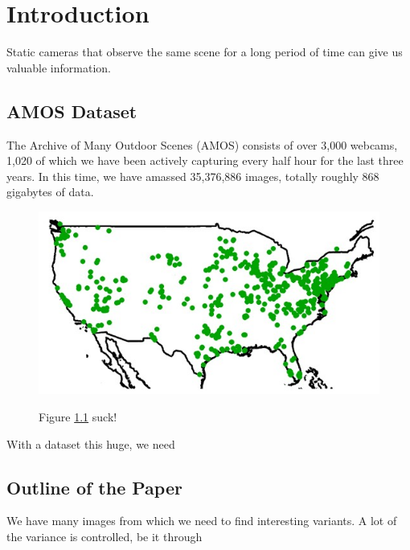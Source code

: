 \chapter{Introduction}
\label{cpt:intro}

Static cameras that observe the same scene for a long period of time can give us valuable information.  



\section{AMOS Dataset}

The Archive of Many Outdoor Scenes (AMOS) consists of over 3,000 webcams, 1,020 of which we have been actively capturing every half hour for the last three years.  In this time, we have amassed 35,376,886 images, totally roughly 868 gigabytes of data.

\begin{figure}[ht]
\centering
\includegraphics[width = 1\textwidth]{figures/localizationMap.jpg}
\label{fig:localizationMap}
\caption[Map]{Figure \ref{fig:localizationMap} suck!}
\end{figure}

With a dataset this huge, we need

\section{Outline of the Paper}

We have many images from which we need to find interesting variants.  A lot of the variance is controlled, be it through 



